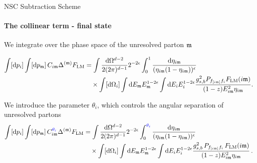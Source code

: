 \begin{frame} {NSC Subtraction Scheme}
  \framesubtitle{The collinear term - final state}
We integrate over the phase space of the unresolved parton $\mathfrak{m}$ 

  \begin{align*}
  \int [\mathrm{d}p_i] \int [\mathrm{d}p_{\mathfrak{m}}] \, C_{i\mathfrak{m}} \Delta^{(\mathfrak{m})} F_{\mathrm{LM}} 
  &= \int \frac{\mathrm{d}\Omega^{d-2}}{2(2\pi)^{d-1}} 2^{-2\epsilon} \int_0^1 \frac{\mathrm{d}\eta_{i\mathfrak{m}}}{(\eta_{i\mathfrak{m}}(1-\eta_{i\mathfrak{m}}))^{\epsilon}} \nonumber \\
  &\quad \times \int [\mathrm{d}\Omega_i] \int \mathrm{d}E_{\mathfrak{m}} E_{\mathfrak{m}}^{1-2\epsilon} \int \mathrm{d}E_i E_i^{1-2\epsilon} 
  \frac{g_{s,b}^2 P_{f_{[i\mathfrak{m}]}f_i} F_{\mathrm{LM}} (i\mathfrak{m}) }{(1-z) E_{i\mathfrak{m}}^{2}\eta_{i\mathfrak{m}}} .
    \end{align*}


\pause
We introduce the parameter $\theta_i$, which controls the angular separation of unresolved partons
\begin{equation*}
  \begin{aligned}
    \int [\mathrm{d}p_i] \int [\mathrm{d}p_{\mathfrak{m}}] \, C_{i\mathfrak{m}}^{\textcolor{blue}{\theta_i}} \Delta^{(\mathfrak{m})} F_{\mathrm{LM}} &= \int \frac{\mathrm{d}\Omega^{d-2}}{2(2\pi)^{d-1}} 2^{-2\epsilon} \int_0^{\textcolor{blue}{\theta_i}} \frac{\mathrm{d}\eta_{i\mathfrak{m}}}{(\eta_{i\mathfrak{m}}(1-\eta_{i\mathfrak{m}}))^{\epsilon}} \nonumber \\
    &\quad \times \int [\mathrm{d}\Omega_i] \int \mathrm{d}E_{\mathfrak{m}} E_{\mathfrak{m}}^{1-2\epsilon} \int \mathrm{d}E_i E_i^{1-2\epsilon} \frac{g_{s,b}^2 \,  P_{f_{[i\mathfrak{m}]}f_i} \, F_{\mathrm{LM}} (i\mathfrak{m}) }{(1-z) E_{i\mathfrak{m}}^{2}\eta_{i\mathfrak{m}}} \, .
  \end{aligned}
\end{equation*}
\end{frame}


